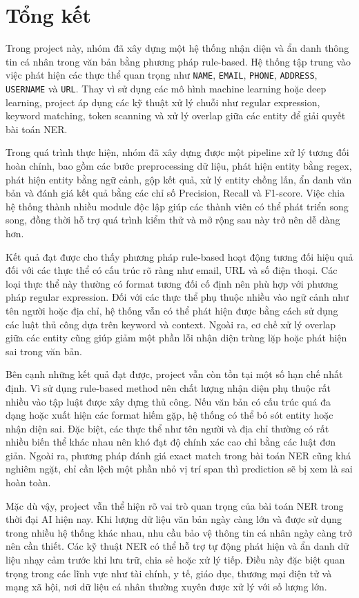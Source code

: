 \section{Tổng kết}

Trong project này, nhóm đã xây dựng một hệ thống nhận diện và ẩn danh thông tin cá nhân trong văn bản bằng phương pháp rule-based. Hệ thống tập trung vào việc phát hiện các thực thể quan trọng như \texttt{NAME}, \texttt{EMAIL}, \texttt{PHONE}, \texttt{ADDRESS}, \texttt{USERNAME} và \texttt{URL}. Thay vì sử dụng các mô hình machine learning hoặc deep learning, project áp dụng các kỹ thuật xử lý chuỗi như regular expression, keyword matching, token scanning và xử lý overlap giữa các entity để giải quyết bài toán NER.

Trong quá trình thực hiện, nhóm đã xây dựng được một pipeline xử lý tương đối hoàn chỉnh, bao gồm các bước preprocessing dữ liệu, phát hiện entity bằng regex, phát hiện entity bằng ngữ cảnh, gộp kết quả, xử lý entity chồng lấn, ẩn danh văn bản và đánh giá kết quả bằng các chỉ số Precision, Recall và F1-score. Việc chia hệ thống thành nhiều module độc lập giúp các thành viên có thể phát triển song song, đồng thời hỗ trợ quá trình kiểm thử và mở rộng sau này trở nên dễ dàng hơn.

Kết quả đạt được cho thấy phương pháp rule-based hoạt động tương đối hiệu quả đối với các thực thể có cấu trúc rõ ràng như email, URL và số điện thoại. Các loại thực thể này thường có format tương đối cố định nên phù hợp với phương pháp regular expression. Đối với các thực thể phụ thuộc nhiều vào ngữ cảnh như tên người hoặc địa chỉ, hệ thống vẫn có thể phát hiện được bằng cách sử dụng các luật thủ công dựa trên keyword và context. Ngoài ra, cơ chế xử lý overlap giữa các entity cũng giúp giảm một phần lỗi nhận diện trùng lặp hoặc phát hiện sai trong văn bản.

Bên cạnh những kết quả đạt được, project vẫn còn tồn tại một số hạn chế nhất định. Vì sử dụng rule-based method nên chất lượng nhận diện phụ thuộc rất nhiều vào tập luật được xây dựng thủ công. Nếu văn bản có cấu trúc quá đa dạng hoặc xuất hiện các format hiếm gặp, hệ thống có thể bỏ sót entity hoặc nhận diện sai. Đặc biệt, các thực thể như tên người và địa chỉ thường có rất nhiều biến thể khác nhau nên khó đạt độ chính xác cao chỉ bằng các luật đơn giản. Ngoài ra, phương pháp đánh giá exact match trong bài toán NER cũng khá nghiêm ngặt, chỉ cần lệch một phần nhỏ vị trí span thì prediction sẽ bị xem là sai hoàn toàn.

Mặc dù vậy, project vẫn thể hiện rõ vai trò quan trọng của bài toán NER trong thời đại AI hiện nay. Khi lượng dữ liệu văn bản ngày càng lớn và được sử dụng trong nhiều hệ thống khác nhau, nhu cầu bảo vệ thông tin cá nhân ngày càng trở nên cần thiết. Các kỹ thuật NER có thể hỗ trợ tự động phát hiện và ẩn danh dữ liệu nhạy cảm trước khi lưu trữ, chia sẻ hoặc xử lý tiếp. Điều này đặc biệt quan trọng trong các lĩnh vực như tài chính, y tế, giáo dục, thương mại điện tử và mạng xã hội, nơi dữ liệu cá nhân thường xuyên được xử lý với số lượng lớn.

